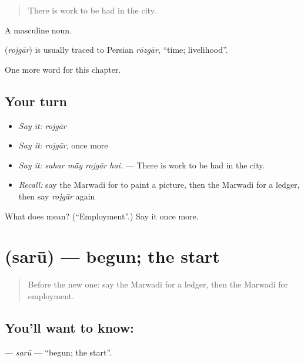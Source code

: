 \begin{quote}
There is work to be had in the city.
\end{quote}

A masculine noun.

\begin{cousinweb}
\textbf{} (\emph{rojgār}) is usually traced to Persian \emph{rōzgār}, \textquotedblleft{}time; livelihood\textquotedblright{}.
\end{cousinweb}

\begin{grammarlens}[title={What you've built}]
One more word for this chapter.
\end{grammarlens}

\subsection*{Your turn}
\begin{itemize}
\raggedright
  \item \emph{Say it:} \emph{rojgār}
  \item \emph{Say it:} \emph{rojgār}, once more
  \item \emph{Say it:} \emph{sahar mā̃y rojgār hai.} — There is work to be had in the city.
  \item \emph{Recall:} say the Marwadi for to paint a picture, then the Marwadi for a ledger, then say \emph{rojgār} again
\end{itemize}

\begin{tcolorbox}[breakable,colback=teal!4,colframe=teal!35!black,title={Before you move on}]
What does  mean? (\textquotedblleft{}Employment\textquotedblright{}.) Say it once more.
\end{tcolorbox}
\section[\texorpdfstring{\mw{सरू} (sarū)}{सरू (sarū)}]{ (sarū) — begun; the start}

\label{lesson:MW-C290-saru}



\begin{quote}
Before the new one: say the Marwadi for a ledger, then the Marwadi for employment.
\end{quote}

\subsection*{You'll want to know: }
\textbf{} — \emph{sarū} — \textquotedblleft{}begun; the start\textquotedblright{}.

